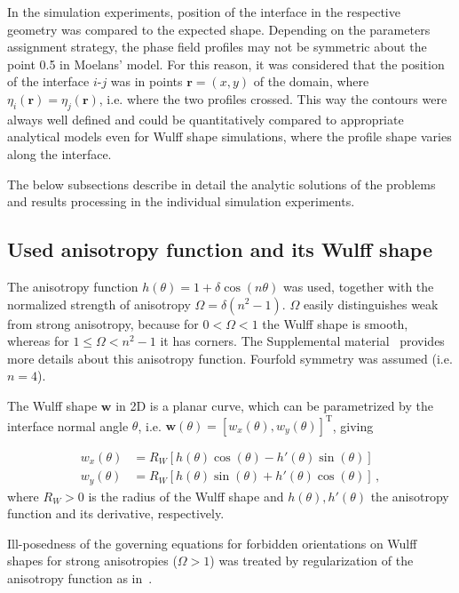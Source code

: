 In the simulation experiments, position of the interface in the respective geometry was compared to the expected shape. Depending on the parameters assignment strategy, the phase field profiles may not be symmetric about the point 0.5 in Moelans' model. For this reason, it was considered that the position of the interface $i$-$j$ was in points $\bm{r}=(x,y)$ of the domain, where $\eta_i(\bm{r})=\eta_j(\bm{r})$, i.e. where the two profiles crossed. This way the contours were always well defined and could be quantitatively compared to appropriate analytical models even for Wulff shape simulations, where the profile shape varies along the interface.

The below subsections describe in detail the analytic solutions of the problems and results processing in the individual simulation experiments. 

\subsection{Used anisotropy function and its Wulff shape}
The anisotropy function $h(\theta)=1+\delta\cos(n\theta)$ was used, together with the normalized strength of anisotropy $\Omega=\delta(n^2-1)$. $\Omega$ easily distinguishes weak from strong anisotropy, because for $0<\Omega<1$ the Wulff shape is smooth, whereas for $1\leq\Omega<n^2-1$ it has corners. The Supplemental material~\cite{Minar2021suppl} provides more details about this anisotropy function. Fourfold symmetry was assumed (i.e. $n=4$).

The Wulff shape $\bm{w}$ in 2D is a planar curve, which can be parametrized by the interface normal angle $\theta$, i.e.  $\bm{w}(\theta)=[w_x(\theta),w_y(\theta)]^\mathrm{T}$, giving \cite{Burton1951,Kobayashi2001,Eggleston2001}

\begin{align} 
	w_x(\theta) &= R_W[h(\theta)\cos(\theta) - h'(\theta)\sin(\theta)] \label{eq_wulff_parametrically_x}\\
	w_y(\theta) &= R_W[h(\theta)\sin(\theta) + h'(\theta)\cos(\theta)] \label{eq_wulff_parametrically_y}\,,
\end{align}
where $R_W>0$ is the radius of the Wulff shape and $h(\theta),h'(\theta)$ the anisotropy function and its derivative, respectively.  

Ill-posedness of the governing equations for forbidden orientations on Wulff shapes for strong anisotropies ($\Omega>1$) was treated by regularization of the anisotropy function as in~\cite{Eggleston2001}.


